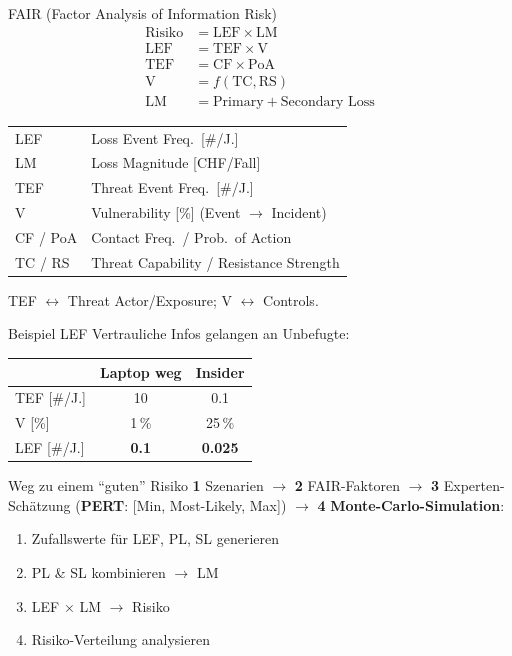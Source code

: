 \documentclass[a4paper, fontsize=7pt]{scrartcl}
\renewcommand*{\arraystretch}{1.5}  %
\begin{document}
\begin{mainbox}{FAIR (Factor Analysis of Information Risk)}
\begin{align*}
\text{Risiko} &= \text{LEF} \times \text{LM} \\
\text{LEF} &= \text{TEF} \times \text{V} \\
\text{TEF} &= \text{CF} \times \text{PoA} \\
\text{V} &= f(\text{TC}, \text{RS}) \\
\text{LM} &= \text{Primary} + \text{Secondary Loss}
\end{align*}
\renewcommand*{\arraystretch}{1.1}
\begin{tabularx}{\linewidth}{@{}l|X@{}}
LEF & Loss Event Freq.\ [\#/J.] \\
LM & Loss Magnitude [CHF/Fall] \\
TEF & Threat Event Freq.\ [\#/J.] \\
V & Vulnerability [\%] (Event $\to$ Incident) \\
CF / PoA & Contact Freq.\ / Prob.\ of Action \\
TC / RS & Threat Capability / Resistance Strength \\
\end{tabularx}
TEF $\leftrightarrow$ Threat Actor/Exposure; V $\leftrightarrow$ Controls.
\end{mainbox}

\begin{subbox}{Beispiel LEF}
Vertrauliche Infos gelangen an Unbefugte:
\renewcommand*{\arraystretch}{1.15}
\begin{center}
\begin{tabular}{l|c|c}
& \textbf{Laptop weg} & \textbf{Insider} \\
\hline
TEF [\#/J.] & 10 & 0.1 \\
V [\%] & 1\,\% & 25\,\% \\
\hline
LEF [\#/J.] & \textbf{0.1} & \textbf{0.025} \\
\end{tabular}
\end{center}
\end{subbox}

\begin{mainbox}{Weg zu einem ``guten'' Risiko}
\textbf{1} Szenarien $\to$ \textbf{2} FAIR-Faktoren $\to$ \textbf{3}
Experten-Schätzung (\textbf{PERT}: [Min, Most-Likely, Max]) $\to$ \textbf{4}
\textbf{Monte-Carlo-Simulation}:
\begin{enumerate}
    \item Zufallswerte für LEF, PL, SL generieren
    \item PL \& SL kombinieren $\to$ LM
    \item LEF $\times$ LM $\to$ Risiko
    \item Risiko-Verteilung analysieren
\end{enumerate}
\end{mainbox}
\end{document}
